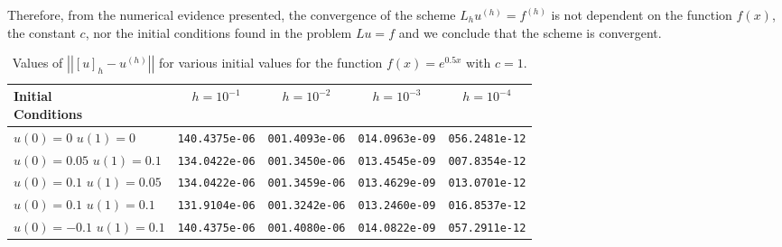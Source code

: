Therefore, from the numerical evidence presented, the convergence of the
scheme $L_h u^{(h)} = f^{(h)}$ is not dependent on the function $f(x)$, the constant
$c$, nor the initial conditions found in the problem $Lu =f$ and we conclude that
the scheme is convergent.

\begin{table}[H]
  \centering
  \bgroup
  \def\arraystretch{1.5}
  \begin{tabular}{| l | c | c | c | c |}
    \hline
    \shortstack[l]{Initial \\ Conditions} & $h = 10^{-1}$ & $h = 10^{-2}$ & $h = 10^{-3}$ & $h = 10^{-4}$ \\
    \hline
    \shortstack[l]{$u(0) = 0$ \\ $u(1) = 0$} & \texttt{140.4375e-06} &   \texttt{001.4093e-06} & \texttt{014.0963e-09}  &  \texttt{056.2481e-12} \\
    \hline
    \shortstack[l]{$u(0) = 0.05$ \\ $u(1) = 0.1$} & \texttt{134.0422e-06} &  \texttt{001.3450e-06} &    \texttt{013.4545e-09} &   \texttt{007.8354e-12} \\
    \hline
    \shortstack[l]{$u(0) = 0.1$ \\ $u(1) = 0.05$} & \texttt{134.0422e-06} &  \texttt{001.3459e-06} &    \texttt{013.4629e-09} &   \texttt{013.0701e-12} \\
    \hline
    \shortstack[l]{$u(0) = 0.1$ \\ $u(1) = 0.1$} & \texttt{131.9104e-06} &  \texttt{001.3242e-06} &    \texttt{013.2460e-09} &   \texttt{016.8537e-12} \\
    \hline
    \shortstack[l]{$u(0) = -0.1$ \\ $u(1) = 0.1$} & \texttt{140.4375e-06} &  \texttt{001.4080e-06} &    \texttt{014.0822e-09} &   \texttt{057.2911e-12} \\
    \hline
  \end{tabular}
  \egroup
  \caption{Values of $\left|\left|[u]_h - u^{(h)}\right|\right|$ for various initial values
     for the function $f(x) = e^{0.5x}$ with $c=1$.}\label{tab:con}
\end{table}
